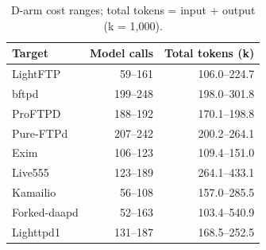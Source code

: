\begin{table}[!tbp]
\centering\small
\caption{D-arm cost ranges; total tokens = input + output (k = 1,000).}
\label{tab:observed_costs}
\begin{tabular}{lrr}
\toprule
Target & Model calls & Total tokens (k) \\
\midrule
LightFTP & 59--161 & 106.0--224.7 \\
bftpd & 199--248 & 198.0--301.8 \\
ProFTPD & 188--192 & 170.1--198.8 \\
Pure-FTPd & 207--242 & 200.2--264.1 \\
Exim & 106--123 & 109.4--151.0 \\
Live555 & 123--189 & 264.1--433.1 \\
Kamailio & 56--108 & 157.0--285.5 \\
Forked-daapd & 52--163 & 103.4--540.9 \\
Lighttpd1 & 131--187 & 168.5--252.5 \\
\bottomrule
\end{tabular}
\end{table}
